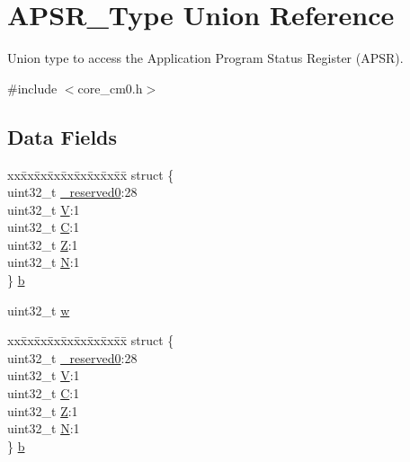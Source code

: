 \hypertarget{union_a_p_s_r___type}{}\section{A\+P\+S\+R\+\_\+\+Type Union Reference}
\label{union_a_p_s_r___type}


Union type to access the Application Program Status Register (A\+P\+SR).  




{\ttfamily \#include $<$core\+\_\+cm0.\+h$>$}

\subsection*{Data Fields}
\begin{DoxyCompactItemize}
\item 
\begin{tabbing}
xx\=xx\=xx\=xx\=xx\=xx\=xx\=xx\=xx\=\kill
struct \{\\
\>uint32\_t \hyperlink{union_a_p_s_r___type_ac8a6a13838a897c8d0b8bc991bbaf7c1}{\_reserved0}:28\\
\>uint32\_t \hyperlink{union_a_p_s_r___type_acd4a2b64faee91e4a9eef300667fa222}{V}:1\\
\>uint32\_t \hyperlink{union_a_p_s_r___type_a7a1caf92f32fe9ebd8d1fe89b06c7776}{C}:1\\
\>uint32\_t \hyperlink{union_a_p_s_r___type_a5ae954cbd9986cd64625d7fa00943c8e}{Z}:1\\
\>uint32\_t \hyperlink{union_a_p_s_r___type_abae0610bc2a97bbf7f689e953e0b451f}{N}:1\\
\} \hyperlink{union_a_p_s_r___type_a2e5b85cff450c7f92c7388dd09f10065}{b}\\

\end{tabbing}\item 
uint32\+\_\+t \hyperlink{union_a_p_s_r___type_ad0fb62e7a08e70fc5e0a76b67809f84b}{w}
\item 
\begin{tabbing}
xx\=xx\=xx\=xx\=xx\=xx\=xx\=xx\=xx\=\kill
struct \{\\
\>uint32\_t \hyperlink{union_a_p_s_r___type_ac8a6a13838a897c8d0b8bc991bbaf7c1}{\_reserved0}:28\\
\>uint32\_t \hyperlink{union_a_p_s_r___type_acd4a2b64faee91e4a9eef300667fa222}{V}:1\\
\>uint32\_t \hyperlink{union_a_p_s_r___type_a7a1caf92f32fe9ebd8d1fe89b06c7776}{C}:1\\
\>uint32\_t \hyperlink{union_a_p_s_r___type_a5ae954cbd9986cd64625d7fa00943c8e}{Z}:1\\
\>uint32\_t \hyperlink{union_a_p_s_r___type_abae0610bc2a97bbf7f689e953e0b451f}{N}:1\\
\} \hyperlink{union_a_p_s_r___type_a398a87eafed8dea4e666d03278e69b74}{b}\\


\end{tabbing}
\end{DoxyCompactItemize}
